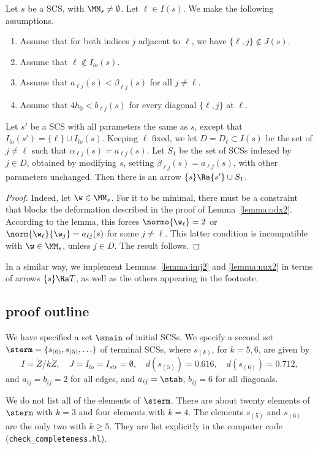 \begin{lemma}  
Let $s$ be a SCS, with $\MM_s\ne\emptyset$.  Let $\ell\in I(s)$.
We make the following assumptions.
\begin{enumerate}
\item Assume that for both indices $j$ adjacent to $\ell$, we have $\{\ell,j\}\not\in
J(s)$.
\item Assume that $\ell\not\in I_{lo}(s)$.
\item Assume that  $a_{\ell j}(s)<\beta_{\ell j}(s)$ for all $j\ne \ell$.
\item
Assume that $4h_0 < b_{\ell j}(s)$ for every diagonal $\{\ell,j\}$ at
$\ell$.  
\end{enumerate}
Let $s'$ be a SCS with all parameters
the same as $s$, except that $I_{lo}(s') = \{\ell\}\cup I_{lo}(s)$.
Keeping $\ell$ fixed, we
let $D=D_\ell\subset I(s)$ be the set of $j\ne \ell$ such that 
$\alpha_{\ell j}(s)=a_{\ell j}(s)$. 
Let $S_1$ be the set of SCSs indexed by $j\in
D$,
obtained by
modifying $s$, setting $\beta_{\ell j}(s)=a_{\ell j}(s)$, with other
parameters unchanged.
Then there is an arrow $\{s\}\Ra \{s'\}\cup S_1$.  
\end{lemma}

\begin{proof}
Indeed, let
$\w\in \MM_s$.  For it to be minimal, there must be a constraint
that blocks the  deformation described in the proof of
Lemma~\ref{lemma:odx2}.
According to the lemma, this forces $\normo{\w_\ell}=2$ or
$\norm{\w_\ell}{\w_j}=a_{\ell j}(s)$ for some $j\ne \ell$.  This latter
condition
is incompatible with $\w\in \MM_s$, unless $j\in D$.  The result
follows.
\end{proof}


In a similar way, we implement Lemmas~\ref{lemma:imj2} and \ref{lemma:nux2} 
in terms of arrows $\{s\}\Ra T$, as well as the others appearing in the footnote.

\subsection{proof outline}

\begin{remark}
We have specified a set $\smain$ of initial SCSs.
We specify a second set $\sterm=\{s_{(6)},s_{(5)},\ldots\}$ 
of terminal SCSs, where
 $s_{(k)}$, for $k=5,6$,  are given by
\[
I=\ring{Z}/k\ring{Z},\quad J=I_{lo}=I_{str}=\emptyset,\quad d(s_{(5)})=0.616,\quad d(s_{(6)})=0.712,
\]
and $a_{ij}=b_{ij}=2$ for all edges, 
and $a_{ij}=\stab$, $b_{ij}=6$ for all diagonals.

We do not list all of the elements of $\sterm$.  There are about twenty
elements of $\sterm$ with $k=3$ and four elements with $k=4$.  The elements
$s_{(5)}$ and $s_{(6)}$ are the only two with $k\ge 5$.
They are list explicitly
in the computer code (\verb!check_completeness.hl!).
\end{remark}


